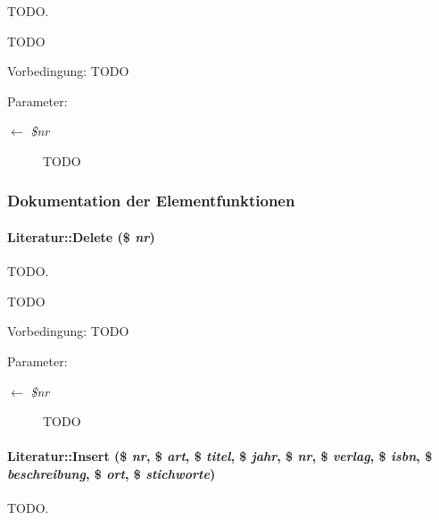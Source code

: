 TODO. 

TODO \begin{Desc}
\item[Vorbedingung:]TODO \end{Desc}
\begin{Desc}
\item[Parameter:]
\begin{description}
\item[\mbox{$\leftarrow$} {\em \$nr}]TODO \end{description}
\end{Desc}


\subsubsection{Dokumentation der Elementfunktionen}
\hypertarget{classLiteratur_f5b265d349df2a9d17079b81d808fa89}{
\paragraph[Delete]{\setlength{\rightskip}{0pt plus 5cm}Literatur::Delete (\$ {\em nr})}\hfill}
\label{classLiteratur_f5b265d349df2a9d17079b81d808fa89}


TODO. 

TODO \begin{Desc}
\item[Vorbedingung:]TODO \end{Desc}
\begin{Desc}
\item[Parameter:]
\begin{description}
\item[\mbox{$\leftarrow$} {\em \$nr}]TODO \end{description}
\end{Desc}
\hypertarget{classLiteratur_6d2064fd0c0be78e10f992396dfd43a4}{
\paragraph[Insert]{\setlength{\rightskip}{0pt plus 5cm}Literatur::Insert (\$ {\em nr}, \$ {\em art}, \$ {\em titel}, \$ {\em jahr}, \$ {\em nr}, \$ {\em verlag}, \$ {\em isbn}, \$ {\em beschreibung}, \$ {\em ort}, \$ {\em stichworte})}\hfill}
\label{classLiteratur_6d2064fd0c0be78e10f992396dfd43a4}


TODO. 

